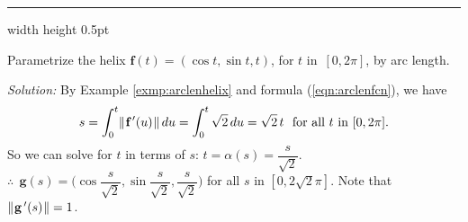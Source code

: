 \smallskip
\hrule width \textwidth height 0.5pt
\begin{exmp}\label{exmp:arcparamhelix}
 Parametrize the helix $\textbf{f}(t) = (\cos t , \sin t , t)$, for $t$ in~$[0,2\pi]$, by arc length.
 \smallskip
 \par\noindent \emph{Solution:} By Example \ref{exmp:arclenhelix} and formula (\ref{eqn:arclenfcn}), we have
 \begin{displaymath}
  s = \int_{0}^{t} \lVert\mspace{1mu}\textbf{f}\,'(u)\mspace{1mu}\rVert\,du = \int_{0}^{t} \sqrt{2} \,du = \sqrt{2}\,t
  \text{~~for all $t$ in $[0,2\pi]$.}
 \end{displaymath}
 So we can solve for $t$ in terms of $s$: $t = \alpha(s) = \dfrac{s}{\sqrt{2}}$.\\$\therefore ~~ \textbf{g}(s) =
 \biggl( \cos \dfrac{s}{\sqrt{2}} , \sin \dfrac{s}{\sqrt{2}} , \dfrac{s}{\sqrt{2}} \biggr)$ for all $s$
 in $[0,2\sqrt{2} \pi]$. 
 Note that $\lVert\mspace{1mu}\textbf{g}\,'(s)\mspace{1mu}\rVert = 1$.
\end{exmp}

